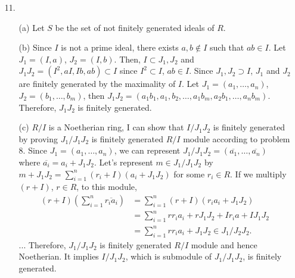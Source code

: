 \documentclass[12pt]{article}
\begin{document}
\begin{enumerate}
\begin{proof}
Let $\frac{1}{p(x)}\in k(x)=\left(\frac{a_1(x)}{b_1(x)},\frac{a_2(x)}{b_2(x)},\ldots, \frac{a_n(x)}{b_n(x)}\right)$, then $\frac{1}{p(x)}\in k\left[\frac{a_1(x)}{b_1(x)},\frac{a_2(x)}{b_2(x)},\ldots, \frac{a_n(x)}{b_n(x)}\right]$. Since $\frac{1}{p(x)}$ is not constant, and right hand side is polynomial, it would be written as $\frac{r(x)}{t(x)}$ for some $r(x),t(x)\in k[x]$. Note that $t(x)$ is at least degree 1 polynomial having a irreducible factor in $p_{ij}(x)$ for some $i,j$.... To meet $\frac{1}{p(x)}=\frac{r(x)}{t(x)}$, $t(x)=p(x)r(x)$ but it means  $r(x)$ is divided by $p(x)$ which is contradiction to assumption. Therefore, $k(x)$ is not finitely generated k-algebra
\end{proof}
\item[11.]\begin{enumerate}
\item[(a)] Let $S$ be the set of not finitely generated ideals of $R$. 
\item[(b)] Since $I$ is not a prime ideal, there exists $a,b\notin I$ such that $ab\in I$. Let $J_1=(I,a)$, $J_2=(I,b)$. Then, $I\subset J_1,J_2$ and $J_1J_2=(I^2, aI, Ib, ab)\subset I$ since $I^2\subset I$, $ab\in I$. Since $J_1,J_2\supset I$, $J_1$ and $J_2$ are finitely generated by the maximality of $I$. Let $J_1=(a_1, \ldots, a_n)$, $J_2=(b_1, \ldots, b_m)$, then $J_1J_2=(a_1b_1, a_1,b_2, \ldots, a_1b_m,a_2b_1, \ldots, a_nb_m)$. Therefore, $J_1J_2$ is finitely generated.
\item[(c)] $R/I$ is a Noetherian ring, I can show that $I/J_1J_2$ is finitely generated by proving $J_1/J_1J_2$ is finitely generated $R/I$ module according to problem 8. Since $J_1=(a_1, \ldots, a_n)$, we can represent $J_1/J_1J_2=(\overline{a_1}, \ldots, \overline{a_n})$ where $\overline{a_i}=a_i+J_1J_2$. Let's represent $m\in J_1/J_1J_2$ by $m+J_1J_2=\sum\limits_{i=1}^n (r_i+I)(a_i+J_1J_2)$ for some $r_i\in R$. If we multiply $(r+I)$, $r\in R$, to this module, 
\begin{equation*}
\begin{split}
(r+I)\left(\sum\limits_{i=1}^n \overline{r_ia_i}\right)&=\sum\limits_{i=1}^n (r+I)(r_ia_i+J_1J_2) \\
&=\sum\limits_{i=1}^n r r_ia_i+rJ_1J_2+Ir_ia+IJ_1J_2 \\
&=\sum\limits_{i=1}^n r r_ia_i+J_1J_2 \in J_1/J_2J_2.
\end{split}
\end{equation*}
...
Therefore, $J_1/J_1J_2$ is finitely generated $R/I$ module and hence Noetherian. It implies $I/J_1J_2$, which is submodule of $J_1/J_1J_2$, is finitely generated.

\end{enumerate}
\end{enumerate}
\end{document}
